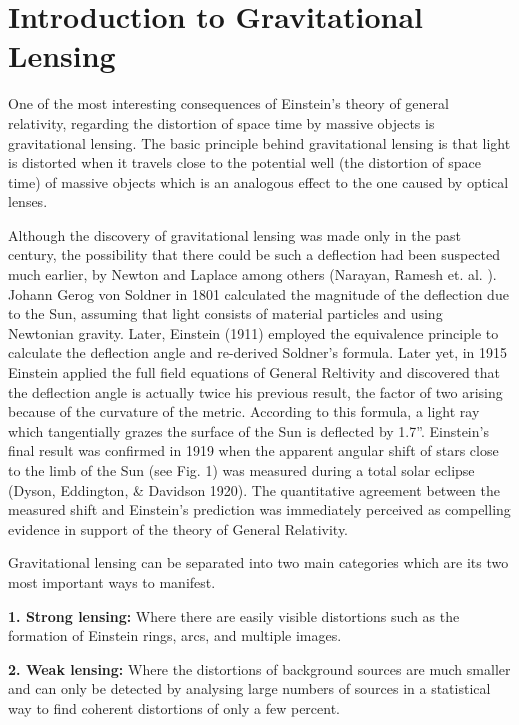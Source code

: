 \chapter{Introduction to Gravitational Lensing}

One of the most interesting consequences of Einstein's theory of general relativity, regarding the distortion of space time by massive objects is gravitational lensing. The basic principle behind gravitational lensing is that light is distorted when it travels close to the potential well (the distortion of space time) of massive objects which is an analogous effect to the one caused by optical lenses. 

Although the discovery of gravitational lensing was made only in the past century, the possibility that there could be such a deflection had been suspected much earlier, by Newton and Laplace among others (Narayan, Ramesh et. al. \citeyear{Reference25}). Johann Gerog von Soldner in 1801 calculated the magnitude of the deflection due to the Sun, assuming that light consists of material particles and using Newtonian gravity. Later, Einstein (1911) employed the equivalence principle to calculate the deflection angle and re-derived Soldner’s formula. Later yet, in 1915 Einstein applied the full field equations of General Reltivity and discovered that the deflection angle is actually twice his previous result, the factor of two arising because of the curvature of the metric. According to this formula, a light ray which tangentially grazes the surface of the Sun is deflected by 1.7''. Einstein’s final result was confirmed in 1919 when the apparent angular shift of stars close to the limb of the Sun (see Fig. 1) was measured during a total solar eclipse (Dyson, Eddington, \& Davidson 1920). The quantitative agreement between the measured shift and Einstein’s prediction was immediately perceived as compelling evidence in support of the theory of General Relativity.

Gravitational lensing can be separated into two main categories which are its two most important ways to manifest.

\textbf{1. Strong lensing:} Where there are easily visible distortions such as the formation of Einstein rings, arcs, and multiple images.

\textbf{2. Weak lensing:} Where the distortions of background sources are much smaller and can only be detected by analysing large numbers of sources in a statistical way to find coherent distortions of only a few percent.

